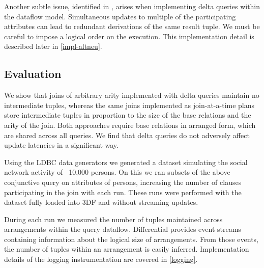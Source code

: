 \documentclass[../catalog.tex]{subfiles}
\begin{document}
Another subtle issue, identified in \cite{dogsdogsdogs}, arises when
implementing delta queries within the dataflow model. Simultaneous
updates to multiple of the participating attributes can lead to
redundant derivations of the same result tuple. We must be careful to
impose a logical order on the execution. This implementation detail is
described later in \autoref{impl-altneu}.

\subsection{Evaluation}

We show that joins of arbitrary arity implemented with delta queries
maintain no intermediate tuples, whereas the same joins implemented as
join-at-a-time plans store intermediate tuples in proportion to the
size of the base relations and the arity of the join. Both approaches
require base relations in arranged form, which are shared across all
queries. We find that delta queries do not adversely affect update
latencies in a significant way.

Using the LDBC data generators we generated a dataset simulating the
social network activity of ~10,000 persons. On this we ran subsets of
the above conjunctive query on attributes of persons, increasing the
number of clauses participating in the join with each run. These runs
were performed with the dataset fully loaded into 3DF and without
streaming updates.

During each run we measured the number of tuples maintained across
arrangements within the query dataflow. Differential provides event
streams containing information about the logical size of
arrangements. From those events, the number of tuples within an
arrangement is easily inferred. Implementation details of the logging
instrumentation are covered in \autoref{logging}.
\end{document}
